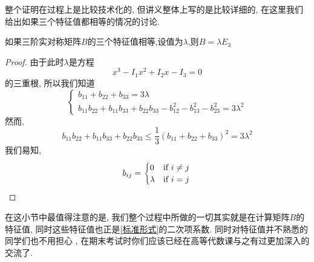 \documentclass[./main.tex]{subfiles}
\begin{document}
整个证明在过程上是比较技术化的, 但讲义整体上写的是比较详细的, 在这里我们给出如果三个特征值都相等的情况的讨论. 
\begin{proposition}
    如果三阶实对称矩阵$B$的三个特征值相等,设值为$\lambda$,则$B=\lambda E_3$
\end{proposition}
\begin{proof}
    由于此时$\lambda$是方程
    \[
    x^3-I_1x^2+I_2x-I_3=0
    \]
    的三重根, 所以我们知道
\[
    \begin{cases}
        b_{11}+b_{22}+b_{33}=3\lambda\\
        b_{11}b_{22}+b_{11}b_{33}+b_{22}b_{33}-b_{12}^2-b_{13}^2-b_{23}^2=3\lambda^2
    \end{cases}
\]
然而, 
\[b_{11}b_{22}+b_{11}b_{33}+b_{22}b_{33}\leq \frac{1}{3}
(b_{11}+b_{22}+b_{33})^2=3\lambda^2\]
我们易知, \[b_{ij}=
\begin{cases}
    0& \text{if } i\neq j\\
    \lambda& \text{if } i=j
\end{cases}\qedhere
\]
\end{proof}
在这小节中最值得注意的是, 我们整个过程中所做的一切其实就是在计算矩阵$B$的特征值, 
同时这些特征值也正是\eqref{标准形式}的二次项系数. 同时对特征值并不熟悉的同学们也不用担心
, 在期末考试时你们应该已经在高等代数课与之有过更加深入的交流了. 
\end{document}
